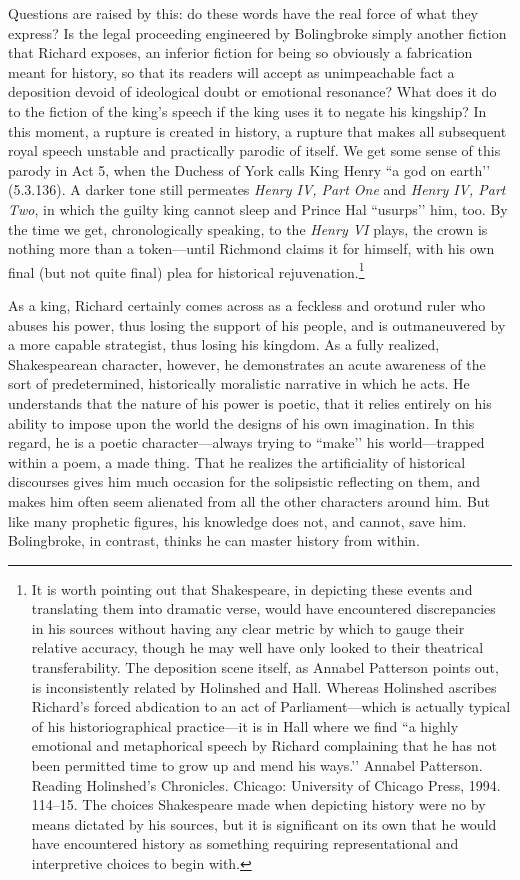 Questions are raised by this: do these words have the real force of what they express? Is the legal proceeding engineered by Bolingbroke simply another fiction that Richard exposes, an inferior fiction for being so obviously a fabrication meant for history, so that its readers will accept as unimpeachable fact a deposition devoid of ideological doubt or emotional resonance? What does it do to the fiction of the king’s speech if the king uses it to negate his kingship? In this moment, a rupture is created in history, a rupture that makes all subsequent royal speech unstable and practically parodic of itself.
We get some sense of this parody in Act 5, when the Duchess of York calls King Henry ``a god on earth’’ (5.3.136).
A darker tone still permeates \emph{Henry IV, Part One} and \emph{Henry IV, Part Two}, in which the guilty king cannot sleep and Prince Hal ``usurps’’ him, too.
By the time we get, chronologically speaking, to the \emph{Henry VI} plays, the crown is nothing more than a token---until Richmond claims it for himself, with his own final (but not quite final) plea for historical rejuvenation.\footnote{It is worth pointing out that Shakespeare, in depicting these events and translating them into dramatic verse, would have encountered discrepancies in his sources without having any clear metric by which to gauge their relative accuracy, though he may well have only looked to their theatrical transferability.
The deposition scene itself, as Annabel Patterson points out, is inconsistently related by Holinshed and Hall.
Whereas Holinshed ascribes Richard’s forced abdication to an act of Parliament---which is actually typical of his historiographical practice---it is in Hall where we find ``a highly emotional and metaphorical speech by Richard complaining that he has not been permitted time to grow up and mend his ways.’’ Annabel Patterson.
Reading Holinshed’s Chronicles. Chicago: University of Chicago Press, 1994. 114--15.
The choices Shakespeare made when depicting history were no by means dictated by his sources, but it is significant on its own that he would have encountered history as something requiring representational and interpretive choices to begin with.}

As a king, Richard certainly comes across as a feckless and orotund ruler who abuses his power, thus losing the support of his people, and is outmaneuvered by a more capable strategist, thus losing his kingdom.
As a fully realized, Shakespearean character, however, he demonstrates an acute awareness of the sort of predetermined, historically moralistic narrative in which he acts.
He understands that the nature of his power is poetic, that it relies entirely on his ability to impose upon the world the designs of his own imagination.
In this regard, he is a poetic character---always trying to ``make’’ his world---trapped within a poem, a made thing.
That he realizes the artificiality of historical discourses gives him much occasion for the solipsistic reflecting on them, and makes him often seem alienated from all the other characters around him.
But like many prophetic figures, his knowledge does not, and cannot, save him.
Bolingbroke, in contrast, thinks he can master history from within.

